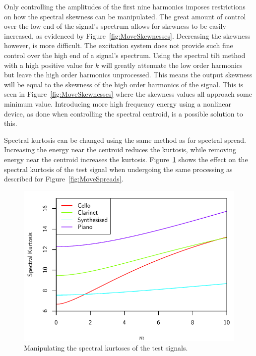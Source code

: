 			Only controlling the amplitudes of the first nine harmonics imposes restrictions on how the
			spectral skewness can be manipulated. The great amount of control over the low end of the signal's
			spectrum allows for skewness to be easily increased, as evidenced by
			Figure~\ref{fig:MoveSkewnesses}.  Decreasing the skewness however, is more difficult. The
			excitation system does not provide such fine control over the high end of a signal's spectrum.
			Using the spectral tilt method with a high positive value for $k$ will greatly attenuate the low
			order harmonics but leave the high order harmonics unprocessed. This means the output skewness will
			be equal to the skewness of the high order harmonics of the signal. This is seen in
			Figure~\ref{fig:MoveSkewnesses} where the skewness values all approach some minimum value.
			Introducing more high frequency energy using a nonlinear device, as done when controlling the
			spectral centroid, is a possible solution to this.

			Spectral kurtosis can be changed using the same method as for spectral spread. Increasing the
			energy near the centroid reduces the kurtosis, while removing energy near the centroid increases
			the kurtosis. Figure~\ref{fig:MoveKurtoses} shows the effect on the spectral kurtosis of the test
			signal when undergoing the same processing as described for Figure~\ref{fig:MoveSpreads}.
			
			\begin{figure}[h!]
				\centering
				\includegraphics{chapter6/Images/MoveKurtoses.pdf}
				\caption{Manipulating the spectral kurtoses of the test signals.}
				\label{fig:MoveKurtoses}
			\end{figure}

